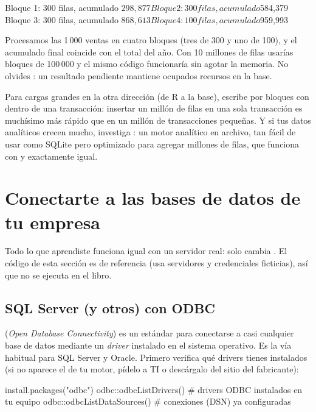 \begin{rsalida}
Bloque 1: 300 filas, acumulado $298,877
Bloque 2: 300 filas, acumulado $584,379
Bloque 3: 300 filas, acumulado $868,613
Bloque 4: 100 filas, acumulado $959,993
\end{rsalida}

Procesamos las 1\,000 ventas en cuatro bloques (tres de 300 y uno de 100),
y el acumulado final coincide con el total del año. Con 10 millones de
filas usarías bloques de 100\,000 y el mismo código funcionaría sin
agotar la memoria. No olvides : un resultado
pendiente mantiene ocupados recursos en la base.

\begin{consejo}
Para cargas grandes en la otra dirección (de R a la base), escribe por
bloques con  dentro de una transacción: insertar
un millón de filas en una sola transacción es muchísimo más rápido que en
un millón de transacciones pequeñas. Y si tus datos analíticos crecen
mucho, investiga : un motor analítico en archivo, tan fácil
de usar como SQLite pero optimizado para agregar millones de filas, que
funciona con  y  exactamente igual.
\end{consejo}

\section{Conectarte a las bases de datos de tu empresa}
\label{sec:m5-empresa}

Todo lo que aprendiste funciona igual con un servidor real: solo cambia
. El código de esta sección es de referencia (usa
servidores y credenciales ficticias), así que no se ejecuta en el libro.

\subsection{SQL Server (y otros) con ODBC}

 (\emph{Open Database Connectivity}) es un estándar para
conectarse a casi cualquier base de datos mediante un \emph{driver}
instalado en el sistema operativo. Es la vía habitual para SQL Server y
Oracle. Primero verifica qué drivers tienes instalados (si no aparece el de
tu motor, pídelo a TI o descárgalo del sitio del fabricante):

\begin{rnoejecutar}
install.packages("odbc")
odbc::odbcListDrivers()          # drivers ODBC instalados en tu equipo
odbc::odbcListDataSources()      # conexiones (DSN) ya configuradas
\end{rnoejecutar}

